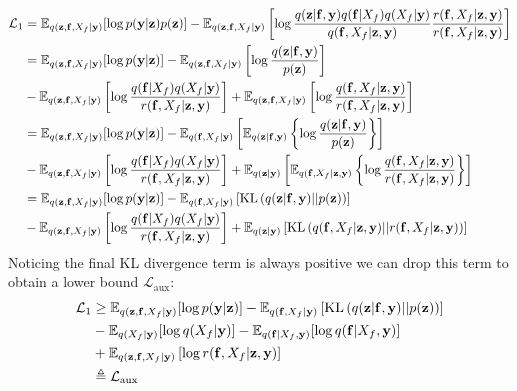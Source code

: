 \documentclass[12pt]{article}
\newcommand{\zb}{\mathbf{z}}
\newcommand{\fb}{\mathbf{f}}
\newcommand{\yb}{\mathbf{y}}
\newcommand{\Lo}{\mathcal{L}_1}
\newcommand{\Laux}{\mathcal{L}_{\mathrm{aux}}}
\newcommand{\Ex}{\mathbb{E}}
\newcommand{\KL}{\mathrm{KL}}
\begin{document}
\begin{align}
\Lo &= \Ex_{q(\zb,\fb,X_f|\yb)}[\log p(\yb|\zb)p(\zb)] - \Ex_{q(\zb,\fb,X_f|\yb)}\left[\log\frac{q(\zb |\fb, \yb)q(\fb|X_f)q(X_f|\yb)}{q(\fb,X_f | \zb,\yb)} \frac{r(\fb,X_f|\zb,\yb)}{r(\fb,X_f|\zb,\yb)}\right] \\
&= \Ex_{q(\zb,\fb,X_f|\yb)}[\log p(\yb|\zb)] - \Ex_{q(\zb,\fb,X_f|\yb)}\left[\log\frac{q(\zb|\fb,\yb)}{p(\zb)}\right] \notag \\
&-\Ex_{q(\zb,\fb,X_f|\yb)}\left[\log\frac{q(\fb|X_f)q(X_f|\yb)}{r(\fb,X_f|\zb,\yb)}\right] + \Ex_{q(\zb,\fb,X_f|\yb)}\left[\log\frac{q(\fb,X_f|\zb,\yb)}{r(\fb,X_f|\zb,\yb)}\right] \\
&= \Ex_{q(\zb,\fb,X_f|\yb)}[\log p(\yb|\zb)] - \Ex_{q(\fb,X_f|\yb)}\left[\Ex_{q(\zb|\fb,\yb)}\left\{\log\frac{q(\zb|\fb,\yb)}{p(\zb)}\right\}\right] \notag \\
&-\Ex_{q(\zb,\fb,X_f|\yb)}\left[\log\frac{q(\fb|X_f)q(X_f|\yb)}{r(\fb,X_f|\zb,\yb)}\right] + \Ex_{q(\zb|\yb)}\left[\Ex_{q(\fb,X_f|\zb,\yb)}\left\{\log\frac{q(\fb,X_f|\zb,\yb)}{r(\fb,X_f|\zb,\yb)}\right\}\right] \\
&= \Ex_{q(\zb,\fb,X_f|\yb)}[\log p(\yb|\zb)] - \Ex_{q(\fb,X_f|\yb)}\left[\KL\left(q(\zb|\fb,\yb)||p(\zb)\right)\right] \notag \\
&-\Ex_{q(\zb,\fb,X_f|\yb)}\left[\log\frac{q(\fb|X_f)q(X_f|\yb)}{r(\fb,X_f|\zb,\yb)}\right] + \Ex_{q(\zb|\yb)}\left[\KL\left(q(\fb,X_f|\zb,\yb)||r(\fb,X_f|\zb,\yb)\right)\right]
\end{align}
%
Noticing the final KL divergence term is always positive we can drop this term to obtain a lower bound $\Laux:$
%
\begin{align}
\Lo &\ge \Ex_{q(\zb,\fb,X_f|\yb)}[\log p(\yb|\zb)] - \Ex_{q(\fb,X_f|\yb)}\left[\KL\left(q(\zb|\fb,\yb)||p(\zb)\right)\right] \notag \\
&- \Ex_{q(X_f|\yb)}[\log q(X_f|\yb)] - \Ex_{q(\fb|X_f,\yb)}[\log q(\fb|X_f,\underline{}\yb)]\notag \\
&+ \Ex_{q(\zb,\fb,X_f|\yb)}\left[ \log r(\fb,X_f|\zb,\yb) \right] \\
&\triangleq \Laux
\end{align}
%
\end{document}
